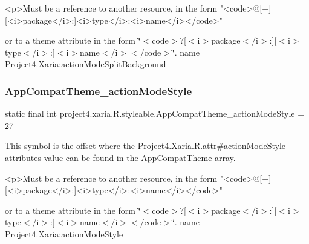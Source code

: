 \begin{DoxyVerb}      <p>Must be a reference to another resource, in the form "<code>@[+][<i>package</i>:]<i>type</i>:<i>name</i></code>"
\end{DoxyVerb}
 or to a theme attribute in the form \char`\"{}$<$code$>$?\mbox{[}$<$i$>$package$<$/i$>$\+:\mbox{]}\mbox{[}$<$i$>$type$<$/i$>$\+:\mbox{]}$<$i$>$name$<$/i$>$$<$/code$>$\char`\"{}.  name Project4.\+Xaria\+:action\+Mode\+Split\+Background \mbox{\label{classproject4_1_1xaria_1_1R_1_1styleable_aa1cbbb6e6f07e19dfc6810cf2e89f0f0}} 
\subsubsection{\texorpdfstring{App\+Compat\+Theme\+\_\+action\+Mode\+Style}{AppCompatTheme\_actionModeStyle}}
{\footnotesize\ttfamily static final int project4.\+xaria.\+R.\+styleable.\+App\+Compat\+Theme\+\_\+action\+Mode\+Style = 27\hspace{0.3cm}{\ttfamily [static]}}

This symbol is the offset where the \hyperlink{}{Project4.\+Xaria.\+R.\+attr\#action\+Mode\+Style} attribute\textquotesingle{}s value can be found in the \hyperlink{classproject4_1_1xaria_1_1R_1_1styleable_aad8bec413e2350f9404e6ff0e831a85d}{App\+Compat\+Theme} array.

\begin{DoxyVerb}      <p>Must be a reference to another resource, in the form "<code>@[+][<i>package</i>:]<i>type</i>:<i>name</i></code>"
\end{DoxyVerb}
 or to a theme attribute in the form \char`\"{}$<$code$>$?\mbox{[}$<$i$>$package$<$/i$>$\+:\mbox{]}\mbox{[}$<$i$>$type$<$/i$>$\+:\mbox{]}$<$i$>$name$<$/i$>$$<$/code$>$\char`\"{}.  name Project4.\+Xaria\+:action\+Mode\+Style \mbox{\label{classproject4_1_1xaria_1_1R_1_1styleable_a018f76fc0960147c4ef1591a74a324cc}} 
